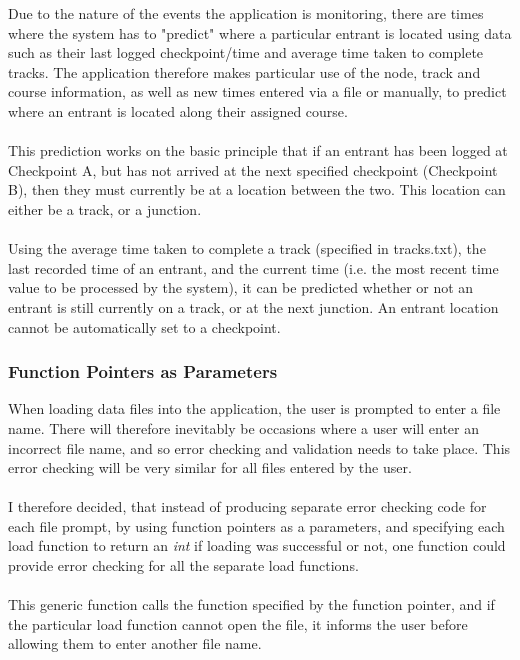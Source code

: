 \documentclass[12pt]{article}
\begin{document}
Due to the nature of the events the application is monitoring, there are times where the system has to "predict" where a particular entrant is located using data such as their last logged checkpoint/time and average time taken to complete tracks. The application therefore makes particular use of the node, track and course information, as well as new times entered via a file or manually, to predict where an entrant is located along their assigned course. \\\\
This prediction works on the basic principle that if an entrant has been logged at Checkpoint A, but has not arrived at the next specified checkpoint (Checkpoint B), then they must currently be at a location between the two. This location can either be a track, or a junction.\\\\ 
Using the average time taken to complete a track (specified in tracks.txt), the last recorded time of an entrant, and the current time (i.e. the most recent time value to be processed by the system), it can be predicted whether or not an entrant is still currently on a track, or at the next junction. An entrant location cannot be automatically set to a checkpoint.

\subsubsection{Function Pointers as Parameters}

When loading data files into the application, the user is prompted to enter a file name. There will therefore inevitably be occasions where a user will enter an incorrect file name, and so error checking and validation needs to take place. This error checking will be very similar for all files entered by the user.\\\\
I therefore decided, that instead of producing separate error checking code for each file prompt, by using function pointers as a parameters, and specifying each load function to return an \textit{int} if loading was successful or not, one function could provide error checking for all the separate load functions. \\\\
This generic function calls the function specified by the function pointer, and if the particular load function cannot open the file, it informs the user before allowing them to enter another file name.
\end{document}
